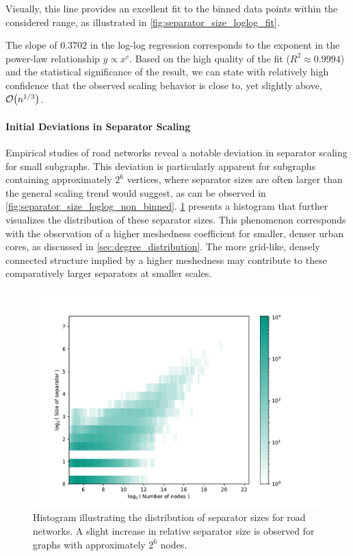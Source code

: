 Visually, this line provides an excellent fit to the binned data points within the considered range, as illustrated in \cref{fig:separator_size_loglog_fit}.

The slope of \( 0.3702 \) in the log-log regression corresponds to the exponent in the power-law relationship \( y \propto x^c \).
Based on the high quality of the fit (\( R^2 \approx 0.9994 \)) and the statistical significance of the result, we can state with relatively high confidence that the observed scaling behavior is close to, yet slightly above, \( \mathcal{O}\!\left(n^{1/3}\right) \).





\paragraph{Initial Deviations in Separator Scaling}

Empirical studies of road networks reveal a notable deviation in separator scaling for small subgraphs.
This deviation is particularly apparent for subgraphs containing approximately \(2^6\) vertices, where separator sizes are often larger than the general scaling trend would suggest, as can be observed in \cref{fig:separator_size_loglog_non_binned}.
\cref{fig:real_europe_hist} presents a histogram that further visualizes the distribution of these separator sizes.
This phenomenon corresponds with the observation of a higher meshedness coefficient for smaller, denser urban cores, as discussed in \cref{sec:degree_distribution}.
The more grid-like, densely connected structure implied by a higher meshedness may contribute to these comparatively larger separators at smaller scales.

\begin{figure}[tbhp]
    \centering
    \includegraphics[width=0.7\linewidth]{graphics/Germany-hist.pdf}
    \caption{Histogram illustrating the distribution of separator sizes for road networks. A slight increase in relative separator size is observed for graphs with approximately \(2^6\) nodes.}
    \label{fig:real_europe_hist}
\end{figure}













